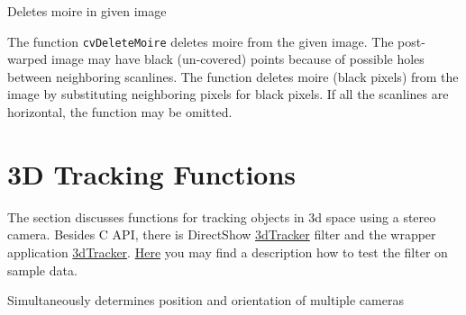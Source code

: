 {

Deletes moire in given image


\begin{description}
\end{description}

The function \texttt{cvDeleteMoire} deletes moire from the given image. The post-warped image may have black (un-covered) points because of possible holes between neighboring scanlines. The function deletes moire (black pixels) from the image by substituting neighboring pixels for black pixels. If all the scanlines are horizontal, the function may be omitted.

\section{3D Tracking Functions} %

The section discusses functions for tracking objects in 3d space using a stereo camera. Besides C API, there is DirectShow \href{http://opencvlibrary.sourceforge.net/../appPage/3dTracker/3dTrackerFilter.htm}{3dTracker} filter and the wrapper application \href{http://opencvlibrary.sourceforge.net/../appPage/3dTracker/3dTracker.htm}{3dTracker}. \href{http://opencvlibrary.sourceforge.net/../appPage/3dTracker/3dTrackerTesting.htm}{Here} you may find a description how to test the filter on sample data.


Simultaneously determines position and orientation of multiple cameras


\begin{description}
\end{description}

}
